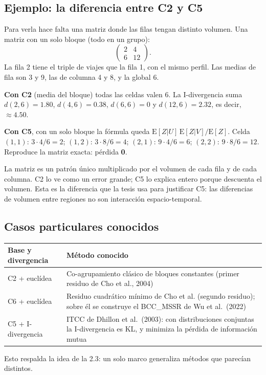 \documentclass[11pt,a4paper]{article}
\begin{document}
\subsection{Ejemplo: la diferencia entre C2 y C5}

Para verla hace falta una matriz donde las filas tengan distinto volumen. Una
matriz con un solo bloque (todo en un grupo):
\[
  \begin{pmatrix}2&4\\6&12\end{pmatrix}.
\]
La fila 2 tiene el triple de viajes que la fila 1, con el mismo perfil. Las medias
de fila son 3 y 9, las de columna 4 y 8, y la global 6.

\textbf{Con C2} (media del bloque) todas las celdas valen 6. La I-divergencia
suma $d(2,6)=1.80$, $d(4,6)=0.38$, $d(6,6)=0$ y $d(12,6)=2.32$, es decir,
$\approx\mathbf{4.50}$.

\textbf{Con C5}, con un solo bloque la fórmula queda
$\mathrm{E}[Z|U]\,\mathrm{E}[Z|V]/\mathrm{E}[Z]$. Celda $(1,1)$: $3\cdot4/6=2$;
$(1,2)$: $3\cdot8/6=4$; $(2,1)$: $9\cdot4/6=6$; $(2,2)$: $9\cdot8/6=12$.
Reproduce la matriz exacta: pérdida \textbf{0}.

La matriz es un patrón único multiplicado por el volumen de cada fila y de cada
columna. C2 lo ve como un error grande; C5 lo explica entero porque descuenta el
volumen. Esta es la diferencia que la tesis usa para justificar C5: las
diferencias de volumen entre regiones no son interacción espacio-temporal.

\subsection{Casos particulares conocidos}

\begin{center}
\renewcommand{\arraystretch}{1.3}
\begin{tabular}{@{}>{\raggedright\arraybackslash}p{4.4cm}>{\raggedright\arraybackslash}p{9.4cm}@{}}
\toprule
\textbf{Base y divergencia} & \textbf{Método conocido} \\
\midrule
C2 + euclídea & Co-agrupamiento clásico de bloques constantes (primer residuo de Cho et al., 2004) \\
\midrule
C6 + euclídea & Residuo cuadrático mínimo de Cho et al. (segundo residuo); sobre él se construye el BCC\_MSSR de Wu et al.\ (2022) \\
\midrule
C5 + I-divergencia & ITCC de Dhillon et al.\ (2003): con distribuciones conjuntas la I-divergencia es KL, y minimiza la pérdida de información mutua \\
\bottomrule
\end{tabular}
\end{center}
Esto respalda la idea de la 2.3: un solo marco generaliza métodos que parecían
distintos.
\end{document}
